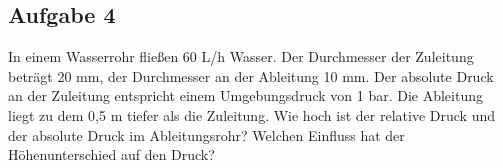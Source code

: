 \documentclass[a4paper,11pt]{article}
\newif\ifshowme
\begin{document}
\subsection*{Aufgabe 4}
%
%
In einem Wasserrohr fließen 60 L/h Wasser. Der Durchmesser der Zuleitung beträgt 20 mm, der Durchmesser an der Ableitung 10 mm. Der absolute Druck an der Zuleitung entspricht einem Umgebungsdruck von 1 bar. Die Ableitung liegt zu dem 0,5 m tiefer als die Zuleitung. Wie hoch ist der relative Druck und der absolute Druck im Ableitungsrohr? Welchen Einfluss hat der Höhenunterschied auf den Druck?
\ifshowme
\end{document}
